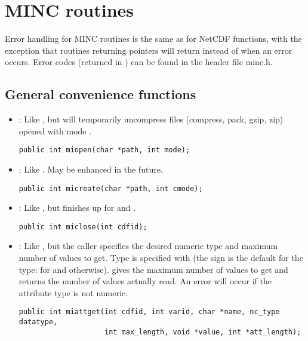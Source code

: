 \section{MINC routines}

Error handling for MINC routines is the same as for NetCDF functions,
with the exception that routines returning pointers will return
 instead of  when an error occurs. Error
codes (returned in ) can be found in the header file
minc.h.

\subsection{General convenience functions}

\begin{itemize}

\item {} : Like , but will temporarily
uncompress files (compress, pack, gzip, zip) opened with mode 
.
\begin{verbatim}
public int miopen(char *path, int mode);
\end{verbatim}

\item {} : Like . May be enhanced in the future.
\begin{verbatim}
public int micreate(char *path, int cmode);
\end{verbatim}

\item {} : Like , but finishes up for 
and .
\begin{verbatim}
public int miclose(int cdfid);
\end{verbatim}

\item {} : Like , but the caller specifies
the desired numeric type and maximum number of values to get. Type is
specified with  (the sign is the default for the type:
 for  and 
otherwise).  gives the maximum number of values to
get and  returns the number of values actually read.
An error will occur if the attribute type is not numeric.
\begin{verbatim}
public int miattget(int cdfid, int varid, char *name, nc_type datatype,
                    int max_length, void *value, int *att_length);
\end{verbatim}


\end{itemize}
